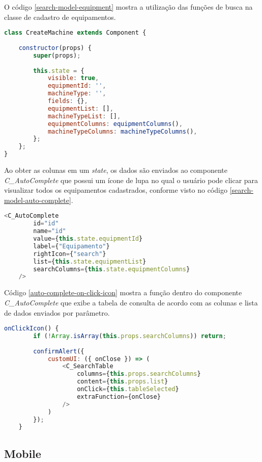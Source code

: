 O código \ref{search-model-equipment} mostra a utilização das funções de busca na classe de cadastro de equipamentos.

\begin{lstlisting}[language=JavaScript, caption={Tela para cadastro de equipamento}, label={search-model-equipment}]
class CreateMachine extends Component {
	
	constructor(props) {
		super(props);
		
		this.state = {
			visible: true,
			equipmentId: '',
			machineType: '',
			fields: {},
			equipmentList: [],
			machineTypeList: [],
			equipmentColumns: equipmentColumns(),
			machineTypeColumns: machineTypeColumns(),
		};
	};
}
\end{lstlisting}

Ao obter as colunas em um \textit{state}, os dados são enviados ao componente \textit{C{\_}AutoComplete} que possui um ícone de lupa no qual o usuário pode clicar para visualizar todos os equipamentos cadastrados, conforme visto no código \ref{search-model-auto-complete}.

\begin{lstlisting}[language=JavaScript, caption={Utilizando o componente C\_AutoComplete}, label={search-model-auto-complete}]
	<C_AutoComplete
		id="id"
		name="id"
		value={this.state.equipmentId}
		label={"Equipamento"}
		rightIcon={"search"}
		list={this.state.equipmentList}
		searchColumns={this.state.equipmentColumns}
	/>
\end{lstlisting}

Código \ref{auto-complete-on-click-icon} mostra a função dentro do componente \textit{C{\_}AutoComplete} que exibe a tabela de consulta de acordo com as colunas e lista de dados enviados por parâmetro.

\begin{lstlisting}[language=JavaScript, caption={Componente C\_AutoComplete: Função executada ao clicar na lupa}, label={auto-complete-on-click-icon}]
	onClickIcon() {
		if (!Array.isArray(this.props.searchColumns)) return;
		
		confirmAlert({
			customUI: ({ onClose }) => (
				<C_SearchTable
					columns={this.props.searchColumns}
					content={this.props.list}
					onClick={this.tableSelected}
					extraFunction={onClose}
				/>
			)
		});
	}
\end{lstlisting}

\subsection{Mobile}
